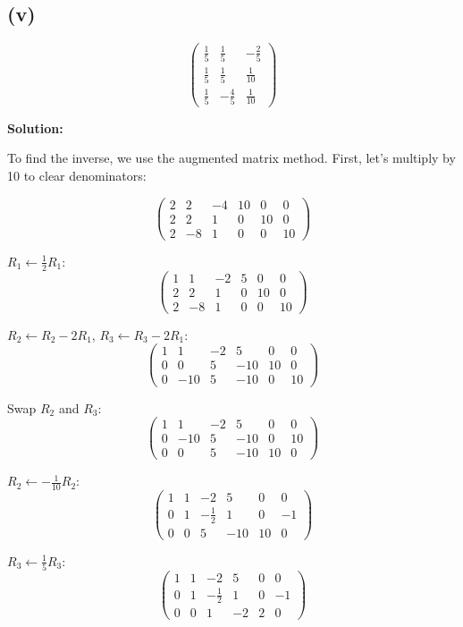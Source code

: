 \subsection*{(v)}
\[
\begin{pmatrix}
\frac{1}{5} & \frac{1}{5} & -\frac{2}{5}\\
\frac{1}{5} & \frac{1}{5} & \frac{1}{10}\\
\frac{1}{5} & -\frac{4}{5} & \frac{1}{10}
\end{pmatrix}
\]

\textbf{Solution:}

To find the inverse, we use the augmented matrix method. First, let's multiply by 10 to clear denominators:

\[
\left(\begin{array}{ccc|ccc}
2 & 2 & -4 & 10 & 0 & 0\\
2 & 2 & 1 & 0 & 10 & 0\\
2 & -8 & 1 & 0 & 0 & 10
\end{array}\right)
\]

$R_1 \leftarrow \frac{1}{2}R_1$:
\[
\left(\begin{array}{ccc|ccc}
1 & 1 & -2 & 5 & 0 & 0\\
2 & 2 & 1 & 0 & 10 & 0\\
2 & -8 & 1 & 0 & 0 & 10
\end{array}\right)
\]

$R_2 \leftarrow R_2 - 2R_1$, $R_3 \leftarrow R_3 - 2R_1$:
\[
\left(\begin{array}{ccc|ccc}
1 & 1 & -2 & 5 & 0 & 0\\
0 & 0 & 5 & -10 & 10 & 0\\
0 & -10 & 5 & -10 & 0 & 10
\end{array}\right)
\]

Swap $R_2$ and $R_3$:
\[
\left(\begin{array}{ccc|ccc}
1 & 1 & -2 & 5 & 0 & 0\\
0 & -10 & 5 & -10 & 0 & 10\\
0 & 0 & 5 & -10 & 10 & 0
\end{array}\right)
\]

$R_2 \leftarrow -\frac{1}{10}R_2$:
\[
\left(\begin{array}{ccc|ccc}
1 & 1 & -2 & 5 & 0 & 0\\
0 & 1 & -\frac{1}{2} & 1 & 0 & -1\\
0 & 0 & 5 & -10 & 10 & 0
\end{array}\right)
\]

$R_3 \leftarrow \frac{1}{5}R_3$:
\[
\left(\begin{array}{ccc|ccc}
1 & 1 & -2 & 5 & 0 & 0\\
0 & 1 & -\frac{1}{2} & 1 & 0 & -1\\
0 & 0 & 1 & -2 & 2 & 0
\end{array}\right)
\]

